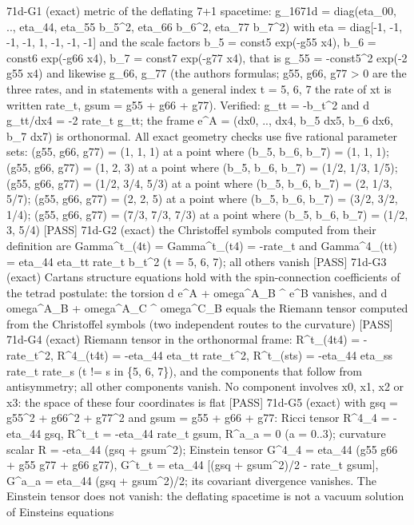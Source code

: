 \documentclass[
  10pt,
]{article}
\newenvironment{Shaded}{}{}
\newcommand{\NormalTok}[1]{#1}
\begin{document}
\begin{Shaded}
\begin{Highlighting}[]
\NormalTok{[PASS] 71d{-}G1  (exact) metric of the deflating 7+1 spacetime: g\_1671d = diag(eta\_00, .., eta\_44, eta\_55 b\_5\^{}2, eta\_66 b\_6\^{}2, eta\_77 b\_7\^{}2) with eta = diag[{-}1, {-}1, {-}1, {-}1, 1, {-}1, {-}1, {-}1] and the scale factors b\_5 = const5 exp({-}g55 x4), b\_6 = const6 exp({-}g66 x4), b\_7 = const7 exp({-}g77 x4), that is g\_55 = {-}const5\^{}2 exp({-}2 g55 x4) and likewise g\_66, g\_77 (the author\textquotesingle{}s formulas; g55, g66, g77 \textgreater{} 0 are the three rates, and in statements with a general index t = 5, 6, 7 the rate of xt is written rate\_t, gsum = g55 + g66 + g77). Verified: g\_tt = {-}b\_t\^{}2 and d g\_tt/dx4 = {-}2 rate\_t g\_tt; the frame e\^{}A = (dx0, .., dx4, b\_5 dx5, b\_6 dx6, b\_7 dx7) is orthonormal. All exact geometry checks use five rational parameter sets: (g55, g66, g77) = (1, 1, 1) at a point where (b\_5, b\_6, b\_7) = (1, 1, 1); (g55, g66, g77) = (1, 2, 3) at a point where (b\_5, b\_6, b\_7) = (1/2, 1/3, 1/5); (g55, g66, g77) = (1/2, 3/4, 5/3) at a point where (b\_5, b\_6, b\_7) = (2, 1/3, 5/7); (g55, g66, g77) = (2, 2, 5) at a point where (b\_5, b\_6, b\_7) = (3/2, 3/2, 1/4); (g55, g66, g77) = (7/3, 7/3, 7/3) at a point where (b\_5, b\_6, b\_7) = (1/2, 3, 5/4)}
\NormalTok{[PASS] 71d{-}G2  (exact) the Christoffel symbols computed from their definition are Gamma\^{}t\_(4t) = Gamma\^{}t\_(t4) = {-}rate\_t and Gamma\^{}4\_(tt) = eta\_44 eta\_tt rate\_t b\_t\^{}2 (t = 5, 6, 7); all others vanish}
\NormalTok{[PASS] 71d{-}G3  (exact) Cartan\textquotesingle{}s structure equations hold with the spin{-}connection coefficients of the tetrad postulate: the torsion d e\^{}A + omega\^{}A\_B \^{} e\^{}B vanishes, and d omega\^{}A\_B + omega\^{}A\_C \^{} omega\^{}C\_B equals the Riemann tensor computed from the Christoffel symbols (two independent routes to the curvature)}
\NormalTok{[PASS] 71d{-}G4  (exact) Riemann tensor in the orthonormal frame: R\^{}t\_(4t4) = {-}rate\_t\^{}2, R\^{}4\_(t4t) = {-}eta\_44 eta\_tt rate\_t\^{}2, R\^{}t\_(sts) = {-}eta\_44 eta\_ss rate\_t rate\_s (t != s in \{5, 6, 7\}), and the components that follow from antisymmetry; all other components vanish. No component involves x0, x1, x2 or x3: the space of these four coordinates is flat}
\NormalTok{[PASS] 71d{-}G5  (exact) with gsq = g55\^{}2 + g66\^{}2 + g77\^{}2 and gsum = g55 + g66 + g77: Ricci tensor R\^{}4\_4 = {-}eta\_44 gsq, R\^{}t\_t = {-}eta\_44 rate\_t gsum, R\^{}a\_a = 0 (a = 0..3); curvature scalar R = {-}eta\_44 (gsq + gsum\^{}2); Einstein tensor G\^{}4\_4 = eta\_44 (g55 g66 + g55 g77 + g66 g77), G\^{}t\_t = eta\_44 [(gsq + gsum\^{}2)/2 {-} rate\_t gsum], G\^{}a\_a = eta\_44 (gsq + gsum\^{}2)/2; its covariant divergence vanishes. The Einstein tensor does not vanish: the deflating spacetime is not a vacuum solution of Einstein\textquotesingle{}s equations}

\end{Highlighting}
\end{Shaded}
\end{document}
